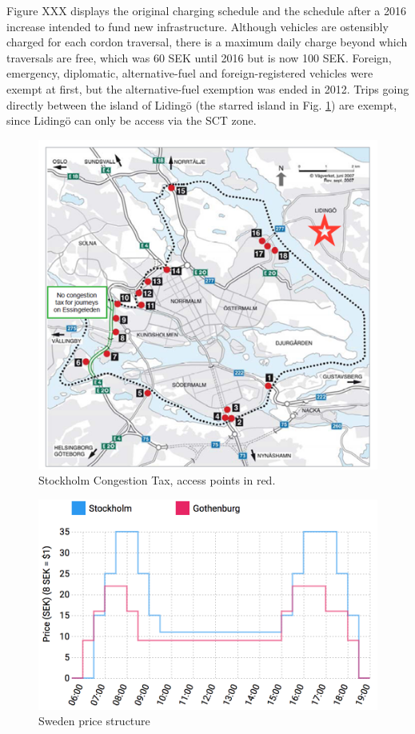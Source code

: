 Figure XXX displays the original charging schedule and the schedule after a 2016 increase intended to fund new infrastructure. Although vehicles are ostensibly charged for each cordon traversal, there is a maximum daily charge beyond which traversals are free, which was 60 SEK until 2016 but is now 100 SEK. Foreign, emergency, diplomatic, alternative-fuel and foreign-registered vehicles were exempt at first, but the alternative-fuel exemption was ended in 2012. Trips going directly between the island of Liding\"o (the starred island in Fig. \ref{fig:stockholm-map}) are exempt, since Liding\"o can only be access via the SCT zone.

\begin{figure}
\includegraphics[width=5in]{../img/stockholm-map.png}
\caption{Stockholm Congestion Tax, access points in red. \citep{transportstyrelsen2015}}
\label{fig:stockholm-map}
\end{figure}

\begin{figure}
\includegraphics[width=4.5in]{../img/sweden-prices.png}
\caption{Sweden price structure \citep{transportstyrelsen2015}}
\label{fig:sweden-schedules}
\end{figure}


